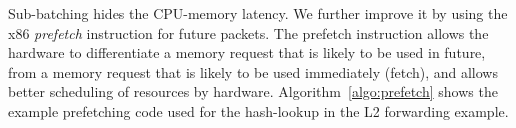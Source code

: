 

Sub-batching hides the CPU-memory latency. We further improve it by using the 
x86 {\em prefetch} instruction for future packets.
The prefetch instruction allows the hardware to differentiate a memory
request that is likely to be used in future, from a memory request that is likely
to be used immediately (fetch), and allows better scheduling of resources by hardware.
Algorithm~\ref{algo:prefetch}
shows the example prefetching code used for the hash-lookup in the L2 forwarding example.

